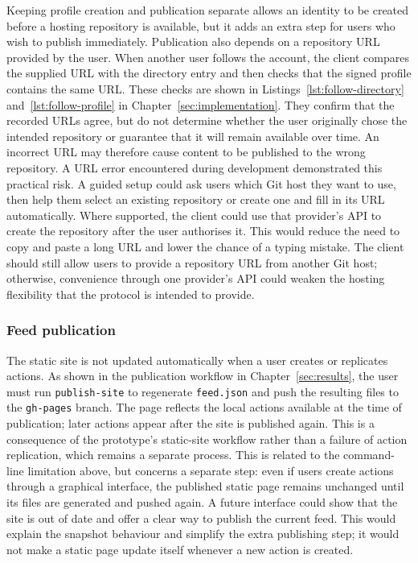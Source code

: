 Keeping profile creation and publication separate allows an identity to be
created before a hosting repository is available, but it adds an extra step
for users who wish to publish immediately. Publication also depends on a
repository URL provided by the user. When another user follows the account,
the client compares the supplied URL with the directory entry and then
checks that the signed profile contains the same URL. These checks are shown
in Listings~\ref{lst:follow-directory} and~\ref{lst:follow-profile} in
Chapter~\ref{sec:implementation}. They confirm that the recorded URLs
agree, but do not determine whether the user originally chose the intended
repository or guarantee that it will remain available over time. An
incorrect URL may therefore cause content to be published to the wrong
repository. A URL error encountered during development demonstrated this
practical risk.
A guided setup could ask users which Git host they want to use, then help
them select an existing repository or create one and fill in its URL
automatically. Where supported, the client could use that provider's API to
create the repository after the user authorises it. This would reduce the
need to copy and paste a long URL and lower the chance of a typing mistake.
The client should still allow users to provide a repository URL from another
Git host; otherwise, convenience through one provider's API could weaken the
hosting flexibility that the protocol is intended to provide.

\subsubsection{Feed publication}\label{sec:limitation-feed-publication}

The static site is not updated automatically when a user creates or
replicates actions. As shown in the publication workflow in
Chapter~\ref{sec:results}, the user must run \texttt{publish-site} to
regenerate \texttt{feed.json} and push the resulting files to the
\texttt{gh-pages} branch. The page reflects the local actions available at
the time of publication; later actions appear after the site is published
again. This is a consequence of the prototype's static-site workflow rather
than a failure of action replication, which remains a separate process.
This is related to the command-line limitation above, but concerns a
separate step: even if users create actions through a graphical interface,
the published static page remains unchanged until its files are generated
and pushed again. A future interface could show that the site is out of date
and offer a clear way to publish the current feed. This would explain the
snapshot behaviour and simplify the extra publishing step; it would not
make a static page update itself whenever a new action is created.

